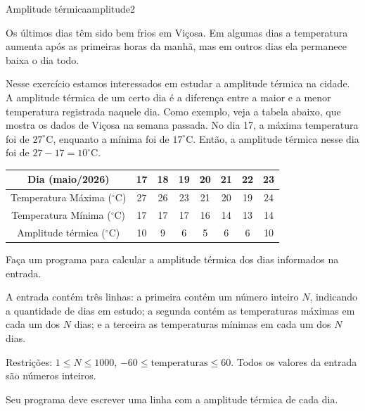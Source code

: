 \documentclass[12pt,a4paper,oneside]{article}
\begin{document}
\begin{problem}{Amplitude térmica}{amplitude}{2}

Os últimos dias têm sido bem frios em Viçosa. Em algumas dias a temperatura aumenta após as primeiras horas da manhã, mas em outros dias ela permanece baixa o dia todo.

Nesse exercício estamos interessados em estudar a amplitude térmica na cidade. A amplitude térmica de um certo dia é a diferença entre a maior e a menor temperatura registrada naquele dia.
Como exemplo, veja a tabela abaixo, que mostra os dados de Viçosa na semana passada. No dia 17, a máxima temperatura foi de $27 ^\circ$C, enquanto a mínima foi de $17 ^\circ$C. Então, a amplitude térmica nesse dia foi de $27 - 17 = 10 ^\circ$C.


\begin{table}[h]
\centering
\begin{tabular}{|c|c|c|c|c|c|c|c|}
\hline
Dia (maio/2026)      & 17 & 18 & 19 & 20 & 21 & 22 & 23 \\
\hline
Temperatura Máxima ($^\circ$C) & 27 & 26 & 23 & 21 & 20 & 19 & 24 \\
Temperatura Mínima ($^\circ$C) & 17 & 17 & 17 & 16 & 14 & 13 & 14 \\
Amplitude térmica ($^\circ$C) & 10 & 9 & 6 & 5 & 6 & 6 & 10 \\
\hline
\end{tabular}
\label{tab:temps}
\end{table}

Faça um programa para calcular a amplitude térmica dos dias informados na entrada.

%

\InputFile

A entrada contém três linhas: a primeira contém um número inteiro $N$, indicando a quantidade de dias em estudo;
a segunda contém as temperaturas máximas em cada um dos $N$ dias;
e a terceira as temperaturas mínimas em cada um dos $N$ dias.

Restrições: $1 \leq N \leq 1000$, $-60 \leq \text{temperaturas} \leq 60$. Todos os valores da entrada são números inteiros.

\OutputFile

Seu programa deve escrever uma linha com a amplitude térmica de cada dia.


\Example

\begin{example}
%
\end{example}

\begin{example}
%
\end{example}


\end{problem}
\end{document}
